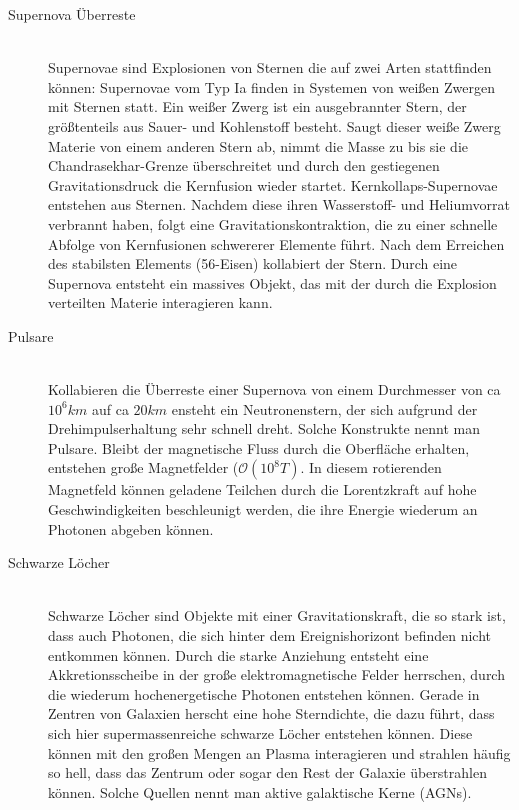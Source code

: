 \begin{description}
\item[Supernova Überreste]\hfill \\
Supernovae sind Explosionen von Sternen die auf zwei Arten stattfinden können:
Supernovae vom Typ Ia finden in Systemen von weißen Zwergen mit Sternen statt. Ein weißer Zwerg ist ein ausgebrannter Stern, der größtenteils aus Sauer- und Kohlenstoff besteht. Saugt dieser weiße Zwerg Materie von einem anderen Stern ab, nimmt die Masse zu bis sie die Chandrasekhar-Grenze überschreitet und durch den gestiegenen Gravitationsdruck die Kernfusion wieder startet.
Kernkollaps-Supernovae entstehen aus Sternen. Nachdem diese ihren Wasserstoff- und Heliumvorrat verbrannt haben, folgt eine Gravitationskontraktion, die zu einer schnelle Abfolge von Kernfusionen schwererer Elemente führt. Nach dem Erreichen des stabilsten Elements (56-Eisen) kollabiert der Stern.
Durch eine Supernova entsteht ein massives Objekt, das mit der durch die Explosion verteilten Materie interagieren kann.

\item[Pulsare]\hfill \\
Kollabieren die Überreste einer Supernova von einem Durchmesser von ca $10^6km$ auf ca $20km$ ensteht ein Neutronenstern, der sich aufgrund der Drehimpulserhaltung sehr schnell dreht. Solche Konstrukte nennt man Pulsare. Bleibt der magnetische Fluss durch die Oberfläche erhalten, entstehen große Magnetfelder ($\mathcal{O}(10^8\unit{T})$\cite{Grupen}. In diesem rotierenden Magnetfeld können geladene Teilchen durch die Lorentzkraft auf hohe Geschwindigkeiten beschleunigt werden, die ihre Energie wiederum an Photonen abgeben können.

\item[Schwarze Löcher]\hfill \\
Schwarze Löcher sind Objekte mit einer Gravitationskraft, die so stark ist, dass auch Photonen, die sich hinter dem Ereignishorizont befinden nicht entkommen können. Durch die starke Anziehung entsteht eine Akkretionsscheibe in der große elektromagnetische Felder herrschen, durch die wiederum hochenergetische Photonen entstehen können.
Gerade in Zentren von Galaxien herscht eine hohe Sterndichte, die dazu führt, dass sich hier supermassenreiche schwarze Löcher entstehen können. Diese können mit den großen Mengen an Plasma interagieren und strahlen häufig so hell, dass das Zentrum oder sogar den Rest der Galaxie überstrahlen können. Solche Quellen nennt man aktive galaktische Kerne (AGNs).


\end{description}
